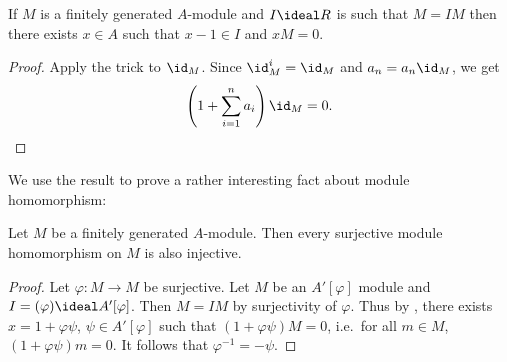 \documentclass[a4paper]{article}
\begin{document}
\begin{corollary}
  \label{cor:Nakayama}
  If \(M\) is a finitely generated \(A\)-module and \(I \ideal R\) is such that \(M = IM\) then there exists \(x \in A\) such that \(x - 1 \in I\) and \(xM = 0\).
\end{corollary}

\begin{proof}
  Apply the trick to \(\id_M\). Since \(\id_M^i = \id_M\) and \(a_n = a_n\id_M\), we get
  \[
    \left(1 + \sum_{i = 1}^n a_i\right) \id_M = 0.
  \]
\end{proof}

We use the result to prove a rather interesting fact about module homomorphism:

\begin{proposition}
  Let \(M\) be a finitely generated \(A\)-module. Then every surjective module homomorphism on \(M\) is also injective.
\end{proposition}

\begin{proof}
  Let \(\varphi: M \to M\) be surjective. Let \(M\) be an \(A'[\varphi]\) module and \(I = (\varphi) \ideal A'[\varphi]\). Then \(M = IM\) by surjectivity of \(\varphi\). Thus by , there exists \(x = 1 + \varphi\psi\), \(\psi \in A'[\varphi]\) such that \((1 + \varphi\psi)M = 0\), i.e.\ for all \(m \in M\), \((1 + \varphi\psi)m = 0\). It follows that \(\varphi^{-1} = -\psi\).
\end{proof}
\end{document}
